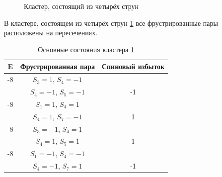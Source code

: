 \documentclass[utf8, babel, sor, jor, amsmath, amssymb, reprint]{elsarticle} %
\begin{document}
\begin{figure}[h]
	\centering
	\caption{Кластер, состоящий из четырёх струн}
	\label{fig:3x3}
\end{figure}

В кластере, состоящем из четырёх струн \ref{fig:3x3} все фрустрированные пары расположены на пересечениях.

\begin{table}[h]
	\centering
	\begin{tabular}{|c|c|c|}
		\hline
		E   &   Фрустрированная пара & Спиновый избыток\\
		\hline
		-8   &  $S_3=1$, $S_4=-1$&\\
		&    $S_4=-1$, $S_5=-1$ & -1\\
		\hline
		-8   &  $S_1=1$, $S_4=1$&\\
		&    $S_4=1$, $S_7=-1$ & 1\\
		\hline
		-8   &  $S_3=-1$, $S_4=1$&\\
			&    $S_4=1$, $S_5=1$& 1\\
		\hline
		-8   &  $S_1=-1$, $S_4=-1$&\\
			&    $S_4=-1$, $S_7=1$& -1\\
		\hline
	\end{tabular}
	\caption{Основные состояния кластера \ref{fig:3x3}}
	\label{tab:gs_3x3}
\end{table} 
\end{document}
